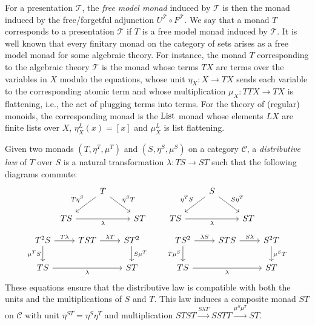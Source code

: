 For a presentation $\mathcal{T}$, the \emph{free model monad} induced by $\mathcal{T}$ is then the monad induced by the free/forgetful adjunction $U^\mathcal{T} \circ F^\mathcal{T}$. We say that a monad $T$ corresponds to a presentation $\mathcal{T}$ if $T$ is a free model monad induced by $\mathcal{T}$. It is well known that every finitary monad on the category of sets arises as a free model monad for some algebraic theory. For instance, the monad $T$ corresponding to the algebraic theory $\mathcal T$ is the monad whose terms $TX$ are terms over the variables in $X$ modulo the equations, whose unit $\eta_X : X \to TX$ sends each variable to the corresponding atomic term and whose multiplication $\mu_X : TTX \to TX$ is flattening, i.e., the act of plugging terms into terms. For the theory of (regular) monoids, the corresponding monad is the $\operatorname{List}$ monad whose elements $LX$ are finite lists over $X$, $\eta_X^L (x) = [x]$ and $\mu_X^L$ is list flattening.


Given two monads $(T, \eta^T, \mu^T)$ and $(S, \eta^S, \mu^S)$ on a category $\mathcal{C}$, a \emph{distributive law} \parencite{distributive_laws} of $T$ over $S$ is a natural transformation $\lambda: TS \to ST$ such that the following diagrams commute:
  \[
  \begin{tikzcd}
                          & T \arrow[ld, "T\eta^S"'] \arrow[rd, "\eta^ST"] &    \\
TS \arrow[rr, "\lambda"'] &                                                & ST
\end{tikzcd}
  \quad\quad
  \begin{tikzcd}
                          & S \arrow[ld, "\eta^TS"'] \arrow[rd, "S\eta^T"] &    \\
TS \arrow[rr, "\lambda"'] &                                                & ST
\end{tikzcd}
  \]
  \[
  \begin{tikzcd}
    T^2 S \arrow[r, "T\lambda"] \arrow[d, "\mu^T S"'] & TST \arrow[r, "\lambda T"] & ST^2 \arrow[d, "S\mu^T"] \\
    TS \arrow[rr, "\lambda"'] & & ST
  \end{tikzcd}
  \quad\quad
  \begin{tikzcd}
    TS^2 \arrow[r, "\lambda S"] \arrow[d, "T\mu^S"'] & STS \arrow[r, "S\lambda"] & S^2T \arrow[d, "\mu^S T"] \\
    TS \arrow[rr, "\lambda"'] & & ST
  \end{tikzcd}
  \]
These equations ensure that the distributive law is compatible with both the units and the multiplications of $S$ and $T$. This law induces a composite monad $ST$ on $\mathcal{C}$ with unit $\eta^{ST} = \eta^S\eta^T$  and multiplication $STST \xrightarrow{S \lambda T} SSTT \xrightarrow {\mu^S \mu^T} ST$.

